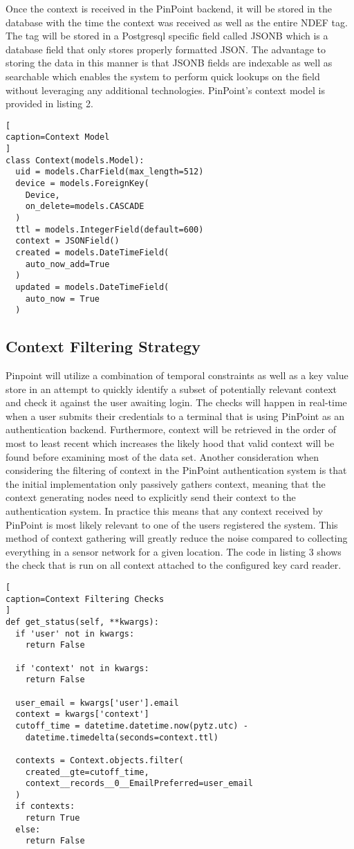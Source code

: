 \documentclass[11pt,journal]{IEEEtran}
\begin{document}
Once the context is received in the PinPoint backend, it will be stored in the database with the time the context was received as well as the entire NDEF tag.  The tag will be stored in a Postgresql specific field called JSONB which is a database field that only stores properly formatted JSON.  The advantage to storing the data in this manner is that JSONB fields are indexable as well as searchable which enables the system to perform quick lookups on the field without leveraging any additional technologies. PinPoint's context model is provided in listing 2.

\begin{lstlisting}[
caption=Context Model
]
class Context(models.Model):
  uid = models.CharField(max_length=512)
  device = models.ForeignKey(
  	Device, 
  	on_delete=models.CASCADE
  )
  ttl = models.IntegerField(default=600)
  context = JSONField()
  created = models.DateTimeField(
  	auto_now_add=True
  )
  updated = models.DateTimeField(
  	auto_now = True
  )
\end{lstlisting}


\subsection{Context Filtering Strategy}
Pinpoint will utilize a combination of temporal constraints as well as a key value store in an attempt to quickly identify a subset of potentially relevant context and check it against the user awaiting login.  The checks will happen in real-time when a user submits their credentials to a terminal that is using PinPoint as an authentication backend.  Furthermore, context will be retrieved in the order of most to least recent which increases the likely hood that valid context will be found before examining most of the data set.  Another consideration when considering the filtering of context in the PinPoint authentication system is that the initial implementation only passively gathers context, meaning that the context generating nodes need to explicitly send their context to the authentication system.  In practice this means that any context received by PinPoint is most likely relevant to one of the users registered the system.  This method of context gathering will greatly reduce the noise compared to collecting everything in a sensor network for a given location.  The code in listing 3 shows the check that is run on all context attached to the configured key card reader.

\begin{lstlisting}[
caption=Context Filtering Checks
]
def get_status(self, **kwargs):
  if 'user' not in kwargs:
    return False

  if 'context' not in kwargs:
    return False

  user_email = kwargs['user'].email
  context = kwargs['context']
  cutoff_time = datetime.datetime.now(pytz.utc) - 
    datetime.timedelta(seconds=context.ttl)

  contexts = Context.objects.filter(
    created__gte=cutoff_time, 
    context__records__0__EmailPreferred=user_email
  )
  if contexts:
    return True
  else:
    return False

\end{lstlisting}
\end{document}
